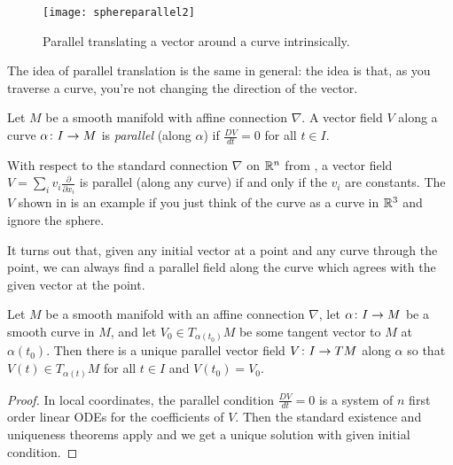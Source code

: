 \begin{example}
	\begin{figure}[htbp]
		\centering
			\texttt{[image: sphereparallel2]}
		\caption{Parallel translating a vector around a curve intrinsically.}
		\label{fig:sphereparallel2}
	\end{figure}
\end{example}

The idea of parallel translation is the same in general: the idea is that, as you traverse a curve, you're not changing the direction of the vector.

\begin{definition}\label{def:parallel vector field}
	Let $M$ be a smooth manifold with affine connection $\nabla$. A vector field $V$ along a curve $\alpha \colon\thinspace\! I \to M$ is \emph{parallel} (along $\alpha$) if $\frac{DV}{dt} = 0$ for all $t \in I$.
\end{definition}

\begin{example}
	With respect to the standard connection $\nabla$ on $\mathbb{R}^n$ from , a vector field $V = \sum_i v_i \frac{\partial}{\partial x_i}$ is parallel (along any curve) if and only if the $v_i$ are constants. The $V$ shown in  is an example if you just think of the curve as a curve in $\mathbb{R}^3$ and ignore the sphere.
\end{example}

It turns out that, given any initial vector at a point and any curve through the point, we can always find a parallel field along the curve which agrees with the given vector at the point.

\begin{proposition}\label{prop:parallel transport}
	Let $M$ be a smooth manifold with an affine connection $\nabla$, let $\alpha \colon\thinspace\! I \to M$ be a smooth curve in $M$, and let $V_0 \in T_{\alpha(t_0)}M$ be some tangent vector to $M$ at $\alpha(t_0)$. Then there is a unique parallel vector field $V \colon\thinspace\! I \to TM$ along $\alpha$ so that $V(t) \in T_{\alpha(t)}M$ for all $t \in I$ and $V(t_0) = V_0$.
\end{proposition}

\begin{proof}
	In local coordinates, the parallel condition $\frac{DV}{dt} = 0$ is a system of $n$ first order linear ODEs for the coefficients of $V$. Then the standard existence and uniqueness theorems apply and we get a unique solution with given initial condition.
\end{proof}

